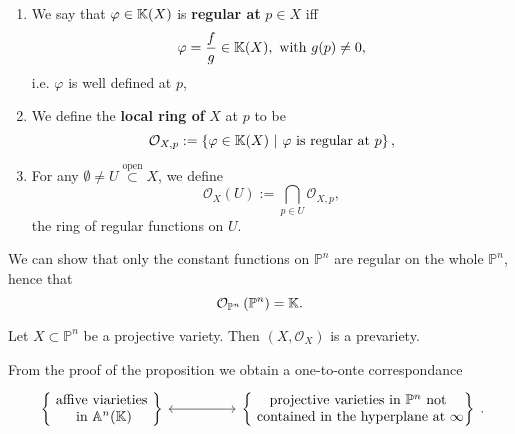 \begin{defn}\leavevmode\vspace{-\baselineskip}
	\begin{enumerate}
		\item We say that $\varphi \in \mathbb{K}(X)$ is \textbf{regular at} $p \in X$ iff
			\begin{equation}
				\varphi = \frac{f}{g} \in \mathbb{K}(X), \text{ with } g(p) \neq 0
			,\end{equation}
			i.e. $\varphi$ is well defined at $p$,
		\item We define the \textbf{local ring of} $X$ at $p$ to be
			\begin{equation}
				\mathcal{O}_{X,p} := \left\{ \varphi \in \mathbb{K}(X) \ \middle|\ \varphi \text{ is regular at } p \right\}
			,\end{equation}
		\item For any $\emptyset \neq U \stackrel{\text{open}}{\subset} X$, we define
			\begin{equation}
				\mathcal{O}_X (U) := \bigcap_{p \in U} \mathcal{O}_{X,p}
			,\end{equation}
			the ring of regular functions on $U$.
	\end{enumerate}
\end{defn}

\begin{rem}
	We can show that only the constant functions on $\mathbb{P}^{n}$ are regular on the whole $\mathbb{P}^{n}$, hence that
	\begin{equation}
	\mathcal{O}_{\mathbb{P}^{n}} \left( \mathbb{P}^{n} \right) = \mathbb{K}
	.\end{equation} 
\end{rem}

\begin{prop}
	Let $X \subset \mathbb{P}^{n}$ be a projective variety.
	Then $\left( X, \mathcal{O}_{ X } \right)$ is a prevariety.
\end{prop} 
\begin{rem}
	From the proof of the proposition we obtain a one-to-onte correspondance
	\begin{equation}
	\begin{tikzcd}[row sep=tiny]
			\left\{\begin{matrix}
				\text{ affive viarieties }\\
				\text{ in } \mathbb{A}^{n}(\K)
			\end{matrix}\right\} \arrow[rr, "", leftrightarrow] & &
			\left\{  \begin{matrix}
				\text{ projective varieties in } \mathbb{P}^{n} \text{ not }\\
				\text{ contained in the hyperplane at } \infty\\
			\end{matrix}\right\}
	\end{tikzcd}
	.\end{equation} 
\end{rem}

